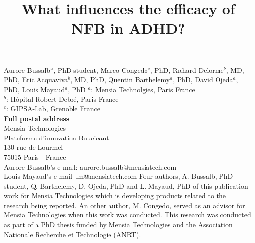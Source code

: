 

\title{What influences the efficacy of NFB in ADHD?} %
\maketitle
\noindent Aurore Bussalb$^a$, PhD student, Marco Congedo$^c$, PhD, Richard Delorme$^b$, MD, PhD, Eric Acquaviva$^b$, MD, PhD,
Quentin Barthelemy$^a$, PhD, David Ojeda$^a$, PhD, Louis Mayaud$^a$, PhD 
\smallbreak
\noindent $^a$: Mensia Technolgies, Paris France \\
\noindent $^b$: Hôpital Robert Debré, Paris France \\ %
\noindent $^c$: GIPSA-Lab, Grenoble France \\
\smallbreak
\noindent\textbf{Full postal address} \\
Mensia Technologies \\
Plateforme d'innovation Boucicaut \\
130 rue de Lourmel \\
75015 Paris - France \\
Aurore Bussalb's e-mail: aurore.bussalb@mensiatech.com \\
Louis Mayaud's e-mail: lm@mensiatech.com 
\smallbreak
Four authors, A. Bussalb, PhD student, Q. Barthelemy, D. Ojeda, PhD and L. Mayaud, PhD of this publication work for Mensia Technologies which is developing products related to the research being reported.
An other author, M. Congedo, served as an advisor for Mensia Technologies when this work was conducted. 
\smallbreak
This research was conducted as part of a PhD thesis funded by Mensia Technologies and the Association Nationale Recherche et Technologie (ANRT).

